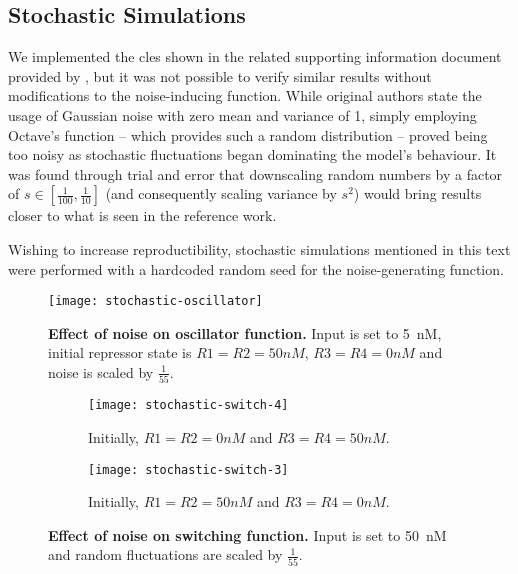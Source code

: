  \subsection{Stochastic Simulations}

    We implemented the \ac{cles} shown in the related supporting information document provided by \citet{originals}, but it was not possible to verify similar results without modifications to the noise-inducing function.
    While original authors state the usage of Gaussian noise with zero mean and variance of 1, simply employing Octave's  function -- which provides such a random distribution \cite{randn} -- proved being too noisy as stochastic fluctuations began dominating the model's behaviour.
    It was found through trial and error that downscaling random numbers by a factor of $s \in [\frac{1}{100}, \frac{1}{10}]$ (and consequently scaling variance by $s^2$) would bring results closer to what is seen in the reference work.

    Wishing to increase reproductibility, stochastic simulations mentioned in this text were performed with a hardcoded random seed for the noise-generating function.

    \begin{figure}[!htb]
      \centering
      \texttt{[image: stochastic-oscillator]}
      \caption{\textbf{Effect of noise on oscillator function.} Input is set to \SI{5}{\nano M}, initial repressor state is $R1 = R2 = 50nM$, $R3 = R4 = 0nM$ and noise is scaled by $\frac{1}{55}$.}
      \label{fig.stochastic-oscillator}
    \end{figure}

    \begin{figure}[!htb]
      \centering
      \begin{subfigure}[t]{0.4\textwidth}
        \centering
        \texttt{[image: stochastic-switch-4]}
        \caption{Initially, $R1 = R2 = 0nM$ and $R3 = R4 = 50nM$.}
        \label{fig.stochastic-switch-4}
      \end{subfigure}
      \hspace{2em}
      \begin{subfigure}[t]{0.4\textwidth}
        \centering
        \texttt{[image: stochastic-switch-3]}
        \caption{Initially, $R1 = R2 = 50nM$ and $R3 = R4 = 0nM$.}
        \label{fig.stochastic-switch-3}
      \end{subfigure}
      \caption{\textbf{Effect of noise on switching function.} Input is set to \SI{50}{\nano M} and random fluctuations are scaled by $\frac{1}{55}$.}
      \label{fig.stochastic-switch}
    \end{figure}

